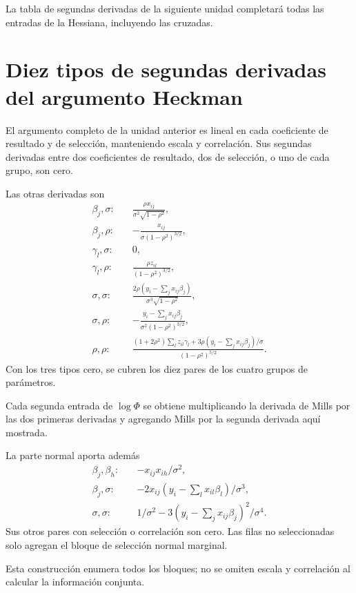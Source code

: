 \documentclass[11pt,a4paper]{article}
\begin{document}
La tabla de segundas derivadas
de la siguiente unidad
completará todas las
entradas de la Hessiana,
incluyendo las cruzadas.

\clearpage
\section{Diez tipos de segundas derivadas del argumento Heckman}\label{unidad148}
El argumento completo de
la unidad anterior es
lineal en cada coeficiente
de resultado y de selección,
manteniendo escala y correlación.
Sus segundas derivadas entre
dos coeficientes de resultado,
dos de selección, o uno
de cada grupo, son cero.

Las otras derivadas son
\[
\begin{aligned}
\beta_j,\sigma:\quad&
\frac{\rho x_{ij}}{\sigma^2\sqrt{1-\rho^2}},\\
\beta_j,\rho:\quad&
-\frac{x_{ij}}{\sigma(1-\rho^2)^{3/2}},\\
\gamma_l,\sigma:\quad&0,\\
\gamma_l,\rho:\quad&
\frac{\rho z_{il}}{(1-\rho^2)^{3/2}},\\
\sigma,\sigma:\quad&
\frac{2\rho(y_i-\sum_jx_{ij}\beta_j)}
{\sigma^3\sqrt{1-\rho^2}},\\
\sigma,\rho:\quad&
-\frac{y_i-\sum_jx_{ij}\beta_j}
{\sigma^2(1-\rho^2)^{3/2}},\\
\rho,\rho:\quad&
\frac{
(1+2\rho^2)\sum_lz_{il}\gamma_l
+3\rho(y_i-\sum_jx_{ij}\beta_j)/\sigma
}{(1-\rho^2)^{5/2}}.
\end{aligned}
\]
Con los tres tipos cero,
se cubren los diez pares
de los cuatro grupos
de parámetros.

Cada segunda entrada de
\(\log\Phi\) se obtiene
multiplicando la derivada de
Mills por las dos
primeras derivadas y agregando
Mills por la segunda
derivada aquí mostrada.

La parte normal aporta además
\[
\begin{aligned}
\beta_j,\beta_h:\quad&-x_{ij}x_{ih}/\sigma^2,\\
\beta_j,\sigma:\quad&
-2x_{ij}(y_i-\sum_lx_{il}\beta_l)/\sigma^3,\\
\sigma,\sigma:\quad&
1/\sigma^2-3(y_i-\sum_jx_{ij}\beta_j)^2/\sigma^4.
\end{aligned}
\]
Sus otros pares con
selección o correlación
son cero.
Las filas no seleccionadas
solo agregan el bloque
de selección normal marginal.

Esta construcción enumera
todos los bloques;
no se omiten escala
y correlación al
calcular la información conjunta.
\end{document}
